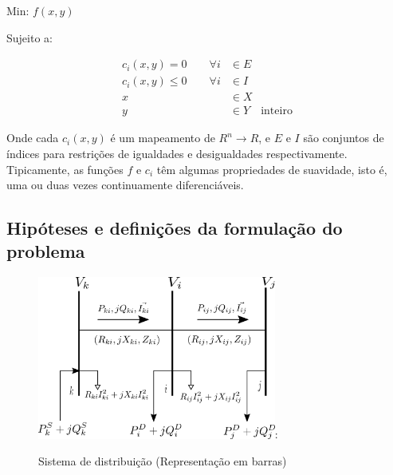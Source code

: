 \begin{tcolorbox}[colback=white!10,title =\textbf{Dados de entrada de um \emph{solver}}]
    \begin{minipage}{\dimexpr\textwidth-\shadowsize-2\fboxrule-2\fboxsep-8pt}
    
    \begin{center}
        Min: $f(x,y)$   
    \end{center}

    \hspace{2cm}Sujeito a: 

    \begin{align*}
        c_{i}(x,y) = 0 \qquad \forall i&\in E\\
        c_{i}(x,y) \leq 0 \qquad \forall i&\in I\\
        x \qquad &\in X\\
        y \qquad &\in Y \quad \text{inteiro}
    \end{align*}
    \end{minipage}
    
    \vspace{1cm}
    
    Onde cada $c_{i}(x,y)$ é um mapeamento de $R^n \to R$, e $E$ e $I$ são conjuntos de índices para restrições de igualdades e desigualdades respectivamente. Tipicamente, as funções $f$ e $c_{i}$ têm algumas propriedades de suavidade, isto é, uma ou duas vezes continuamente diferenciáveis.
\end{tcolorbox}

\subsection{Hipóteses e definições da formulação do problema}

\begin{figure}[H]
    \centering
    \includegraphics[width=0.7\textwidth]{3_Methodology/diagrama_nos.png}:
    \caption{Sistema de distribuição (Representação em barras)}
    \label{fig:SDR}
\end{figure}

